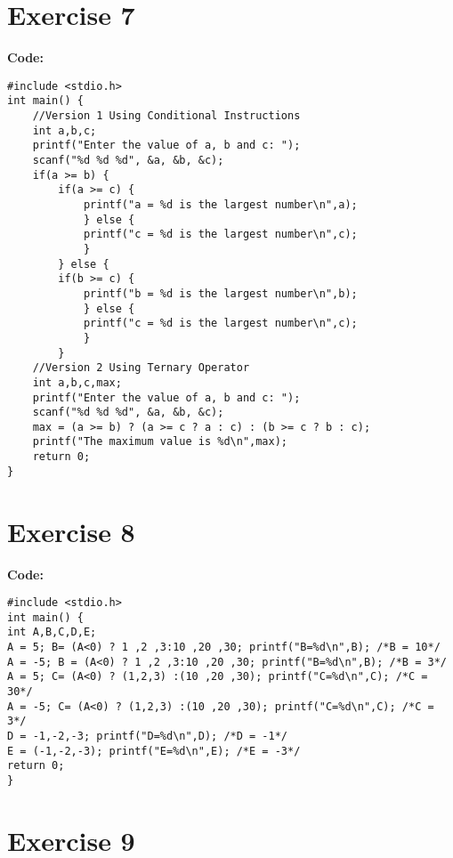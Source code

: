 \documentclass[12pt]{article}
\begin{document}
\section*{Exercise 7}
\vspace{0.5cm}

\textbf{Code:} 
\begin{lstlisting}
#include <stdio.h>
int main() {
	//Version 1 Using Conditional Instructions
	int a,b,c;
	printf("Enter the value of a, b and c: ");
	scanf("%d %d %d", &a, &b, &c);
	if(a >= b) {
		if(a >= c) {
			printf("a = %d is the largest number\n",a);
			} else {
			printf("c = %d is the largest number\n",c);
			}
		} else {
		if(b >= c) {
			printf("b = %d is the largest number\n",b);
			} else {
			printf("c = %d is the largest number\n",c);
			}
		}
	//Version 2 Using Ternary Operator
	int a,b,c,max;
	printf("Enter the value of a, b and c: ");
	scanf("%d %d %d", &a, &b, &c);
	max = (a >= b) ? (a >= c ? a : c) : (b >= c ? b : c);
	printf("The maximum value is %d\n",max);
	return 0;
}
\end{lstlisting}
\vspace{1cm}

\section*{Exercise 8}
\vspace{0.5cm}

\textbf{Code:} 
\begin{lstlisting}
#include <stdio.h>
int main() {
int A,B,C,D,E;
A = 5; B= (A<0) ? 1 ,2 ,3:10 ,20 ,30; printf("B=%d\n",B); /*B = 10*/
A = -5; B = (A<0) ? 1 ,2 ,3:10 ,20 ,30; printf("B=%d\n",B); /*B = 3*/
A = 5; C= (A<0) ? (1,2,3) :(10 ,20 ,30); printf("C=%d\n",C); /*C = 30*/
A = -5; C= (A<0) ? (1,2,3) :(10 ,20 ,30); printf("C=%d\n",C); /*C = 3*/
D = -1,-2,-3; printf("D=%d\n",D); /*D = -1*/
E = (-1,-2,-3); printf("E=%d\n",E); /*E = -3*/
return 0;
}
\end{lstlisting}
\vspace{1cm}
\section*{Exercise 9}
\vspace{0.5cm}
\end{document}
